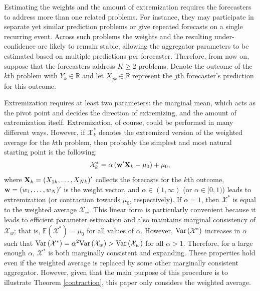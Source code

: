 \documentclass[12pt]{article}
\newcommand{\E}{\mathbb{E}}
\theoremstyle{definition}
\theoremstyle{definition}
\def\w{{\bf w}}
\def\X{{\bf X}}
\def\E{{\mathbb E}}
\def\Var{{\rm Var}\,}
\begin{document}
Estimating the weights and the amount of extremization requires the forecasters to address more than one related problems. For instance, they may participate in separate yet similar prediction problems or give repeated forecasts on a single recurring event. Across such problems the weights and the resulting under-confidence are likely to remain stable, allowing the aggregator parameters to be estimated based on multiple predictions per forecaster. Therefore, from now on, suppose that the forecasters address $K \geq 2$ problems. Denote the outcome of the $k$th problem with $Y_k \in \mathbb{R}$ and let $X_{jk} \in \mathbb{R}$ represent the $j$th forecaster's prediction for this outcome. 



Extremization requires at least two parameters: the marginal mean, which acts as the pivot point and decides the direction of extremizing, and the amount of extremization itself. Extremization, of course, could be performed in many different ways. However, if $\mathcal{X}_k^*$ denotes the extremized version of the weighted average for the $k$th problem, then probably the simplest and most natural starting point is the following:
\begin{align*}
\mathcal{X}_k^* = \alpha  \left(  \w'\X_{k} - \mu_0\right) + \mu_0,
\end{align*}
 where $\X_k = (X_{1k}, \dots, X_{Nk})'$ collects the forecasts for the $k$th outcome, $\w = (w_1, \dots, w_N)'$ is the weight vector, and $\alpha \in (1, \infty)$ (or $\alpha \in [0, 1)$) leads to extremization (or contraction towards $\mu_0$, respectively). If $\alpha = 1$, then $\mathcal{X}^*$ is equal to the weighted average $\mathcal{X}_w$.  This linear form is particularly convenient because it leads to efficient parameter estimation and also maintains marginal consistency of $\mathcal{X}_w$; that is, $\E(\mathcal{X}^*) = \mu_0$ for all values of $\alpha$.  However, $\Var(\mathcal{X}^*)$ increases in $\alpha$ such that $\Var(\mathcal{X}^*) = \alpha^2 \Var(\mathcal{X}_w) > \Var(\mathcal{X}_w)$ for all $\alpha > 1$. Therefore, for a large enough $\alpha$, $\mathcal{X}^*$ is both marginally consistent and expanding. These properties hold even if the weighted average is replaced by some other marginally consistent aggregator. However, given that the main purpose of this procedure is to illustrate Theorem \ref{contraction}, this paper only considers the weighted average. 
 
\end{document}
